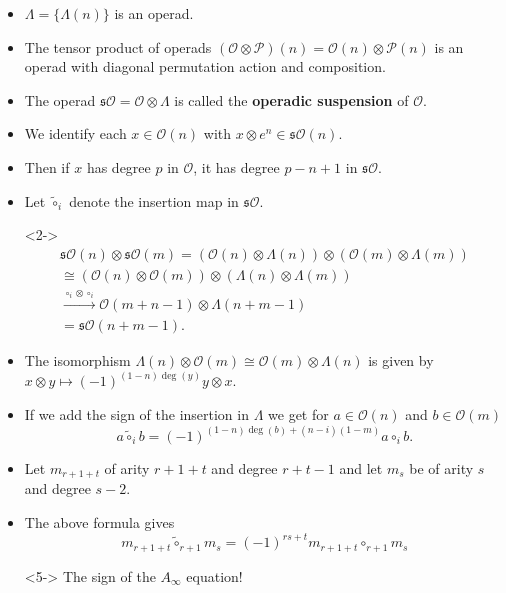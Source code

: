 \documentclass{beamer}
\theoremstyle{definition}
\begin{document}
\begin{frame}
\begin{itemize}
\item<1-> $\Lambda=\{\Lambda(n)\}$ is an operad.
\item<2-> The tensor product of operads $(\mathcal{O}\otimes \mathcal{P})(n)=\mathcal{O}(n)\otimes \mathcal{P}(n)$ is an operad with diagonal permutation action and composition. %
\item<3-> The operad $\mathfrak{s}\mathcal{O}=\mathcal{O}\otimes\Lambda$ is called the \textbf{operadic suspension} of $\mathcal{O}$.
\item<4-> We identify each $x\in\mathcal{O}(n)$ with $x\otimes e^n\in \mathfrak{s}\mathcal{O}(n)$.
\item<5-> Then if $x$ has degree $p$ in $\mathcal{O}$, it has degree $p-n+1$ in $\mathfrak{s}\mathcal{O}$.
\end{itemize}
\end{frame}

\begin{frame}
\begin{itemize}
\item<1-> Let $\tilde{\circ}_i$ denote the insertion map in $\mathfrak{s}\mathcal{O}$.
\item[]<2-> \begin{align*}
\mathfrak{s}\mathcal{O}(n)\otimes\mathfrak{s}\mathcal{O}(m)=(\mathcal{O}(n)\otimes\Lambda(n))\otimes (\mathcal{O}(m)\otimes\Lambda(m))\\
\cong (\mathcal{O}(n)\otimes \mathcal{O}(m))\otimes (\Lambda(n)\otimes \Lambda(m))\\
\xrightarrow{\circ_i\otimes\circ_i} \mathcal{O}(m+n-1)\otimes \Lambda(n+m-1)\\=\mathfrak{s}\mathcal{O}(n+m-1).
\end{align*}
\end{itemize}
\end{frame}
\begin{frame}
\begin{itemize}
\item<1-> The isomorphism $\Lambda(n)\otimes \mathcal{O}(m)\cong \mathcal{O}(m)\otimes \Lambda(n)$ is given by $x\otimes y\mapsto (-1)^{(1-n)\deg(y)}y\otimes x$.
\item<2-> If we add the sign of the insertion in $\Lambda$ we get for $a\in\mathcal{O}(n)$ and $b\in\mathcal{O}(m)$
\[a\tilde{\circ}_ib=(-1)^{(1-n)\deg(b)+(n-i)(1-m)}a\circ_i b.\]
\item<3-> Let $m_{r+1+t}$ of arity $r+1+t$ and degree $r+t-1$ and let $m_s$ be of arity $s$ and degree $s-2$. %
\item<4-> The above formula gives 
\[m_{r+1+t}\tilde{\circ}_{r+1}m_s=(-1)^{rs+t}m_{r+1+t}\circ_{r+1}m_s\]
\item[]<5-> The sign of the $A_\infty$ equation!
\end{itemize}
\end{frame}
\end{document}
